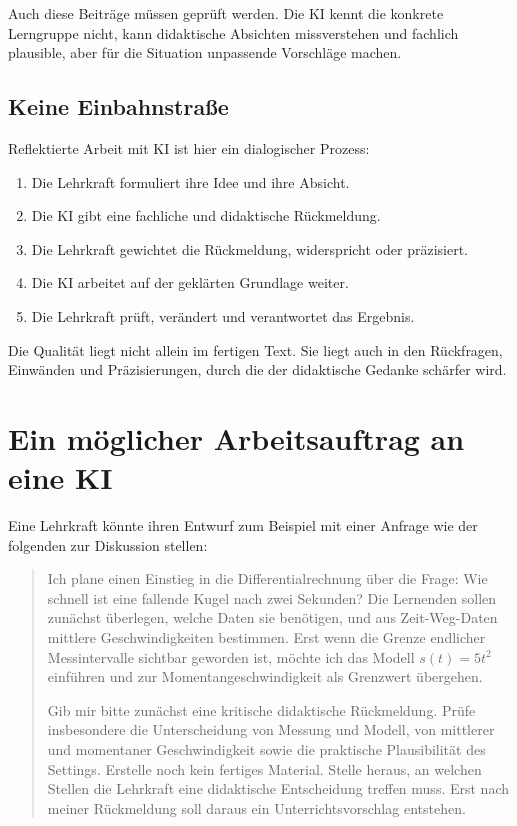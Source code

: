 \documentclass[11pt,a4paper]{article}
\begin{document}
Auch diese Beiträge müssen geprüft werden. Die KI kennt die konkrete Lerngruppe
nicht, kann didaktische Absichten missverstehen und fachlich plausible, aber für
die Situation unpassende Vorschläge machen.

\subsection{Keine Einbahnstraße}

Reflektierte Arbeit mit KI ist hier ein dialogischer Prozess:

\begin{enumerate}
  \item Die Lehrkraft formuliert ihre Idee und ihre Absicht.
  \item Die KI gibt eine fachliche und didaktische Rückmeldung.
  \item Die Lehrkraft gewichtet die Rückmeldung, widerspricht oder präzisiert.
  \item Die KI arbeitet auf der geklärten Grundlage weiter.
  \item Die Lehrkraft prüft, verändert und verantwortet das Ergebnis.
\end{enumerate}

Die Qualität liegt nicht allein im fertigen Text. Sie liegt auch in den
Rückfragen, Einwänden und Präzisierungen, durch die der didaktische Gedanke
schärfer wird.


\section{Ein möglicher Arbeitsauftrag an eine KI}

Eine Lehrkraft könnte ihren Entwurf zum Beispiel mit einer Anfrage wie der
folgenden zur Diskussion stellen:

\begin{quote}
\small
Ich plane einen Einstieg in die Differentialrechnung über die Frage: \glqq Wie
schnell ist eine fallende Kugel nach zwei Sekunden?\grqq{} Die Lernenden sollen
zunächst überlegen, welche Daten sie benötigen, und aus Zeit-Weg-Daten mittlere
Geschwindigkeiten bestimmen. Erst wenn die Grenze endlicher Messintervalle
sichtbar geworden ist, möchte ich das Modell $s(t)=5t^2$ einführen und zur
Momentangeschwindigkeit als Grenzwert übergehen.

Gib mir bitte zunächst eine kritische didaktische Rückmeldung. Prüfe insbesondere
die Unterscheidung von Messung und Modell, von mittlerer und momentaner
Geschwindigkeit sowie die praktische Plausibilität des Settings. Erstelle noch
kein fertiges Material. Stelle heraus, an welchen Stellen die Lehrkraft eine
didaktische Entscheidung treffen muss. Erst nach meiner Rückmeldung soll daraus
ein Unterrichtsvorschlag entstehen.
\end{quote}
\end{document}
